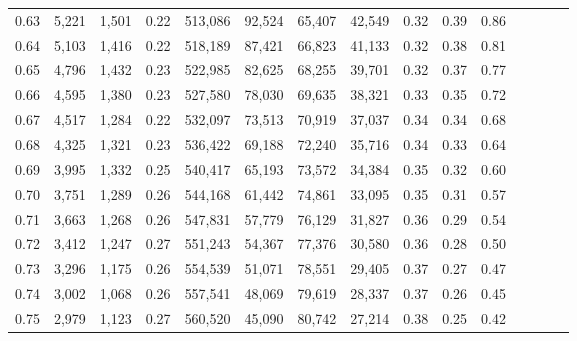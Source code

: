 \begin{tabular}{rrrcrrrrrrrrrrr}
0.63 &   5,221 &  1,501 &                                       0.22 &  513,086 &   92,524 &   65,407 &   42,549 &  0.32 &  0.39 &                         0.86 \\
0.64 &   5,103 &  1,416 &                                       0.22 &  518,189 &   87,421 &   66,823 &   41,133 &  0.32 &  0.38 &                         0.81 \\
0.65 &   4,796 &  1,432 &                                       0.23 &  522,985 &   82,625 &   68,255 &   39,701 &  0.32 &  0.37 &                         0.77 \\
0.66 &   4,595 &  1,380 &                                       0.23 &  527,580 &   78,030 &   69,635 &   38,321 &  0.33 &  0.35 &                         0.72 \\
0.67 &   4,517 &  1,284 &                                       0.22 &  532,097 &   73,513 &   70,919 &   37,037 &  0.34 &  0.34 &                         0.68 \\
0.68 &   4,325 &  1,321 &                                       0.23 &  536,422 &   69,188 &   72,240 &   35,716 &  0.34 &  0.33 &                         0.64 \\
0.69 &   3,995 &  1,332 &                                       0.25 &  540,417 &   65,193 &   73,572 &   34,384 &  0.35 &  0.32 &                         0.60 \\
0.70 &   3,751 &  1,289 &                                       0.26 &  544,168 &   61,442 &   74,861 &   33,095 &  0.35 &  0.31 &                         0.57 \\
0.71 &   3,663 &  1,268 &                                       0.26 &  547,831 &   57,779 &   76,129 &   31,827 &  0.36 &  0.29 &                         0.54 \\
0.72 &   3,412 &  1,247 &                                       0.27 &  551,243 &   54,367 &   77,376 &   30,580 &  0.36 &  0.28 &                         0.50 \\
0.73 &   3,296 &  1,175 &                                       0.26 &  554,539 &   51,071 &   78,551 &   29,405 &  0.37 &  0.27 &                         0.47 \\
0.74 &   3,002 &  1,068 &                                       0.26 &  557,541 &   48,069 &   79,619 &   28,337 &  0.37 &  0.26 &                         0.45 \\
0.75 &   2,979 &  1,123 &                                       0.27 &  560,520 &   45,090 &   80,742 &   27,214 &  0.38 &  0.25 &                         0.42 \\

\end{tabular}
